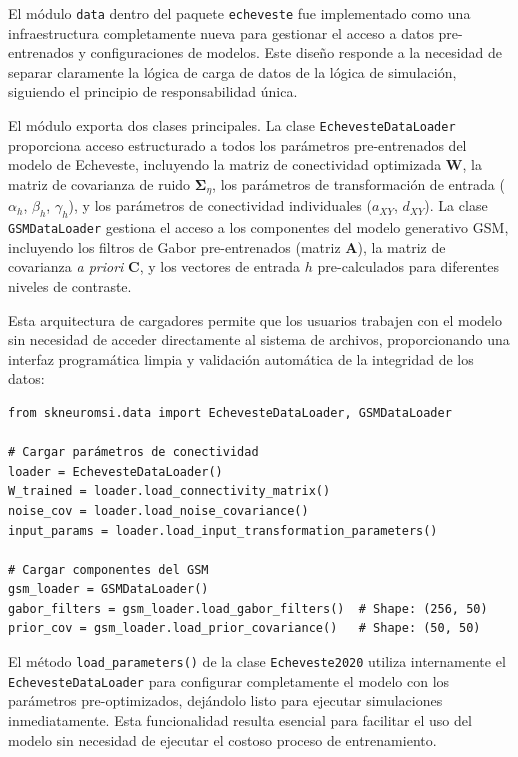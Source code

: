 El módulo \texttt{data} dentro del paquete \texttt{echeveste} fue implementado como una infraestructura completamente nueva para gestionar el acceso a datos pre-entrenados y configuraciones de modelos. Este diseño responde a la necesidad de separar claramente la lógica de carga de datos de la lógica de simulación, siguiendo el principio de responsabilidad única.

El módulo exporta dos clases principales. La clase \texttt{EchevesteDataLoader} proporciona acceso estructurado a todos los parámetros pre-entrenados del modelo de Echeveste, incluyendo la matriz de conectividad optimizada $\mathbf{W}$, la matriz de covarianza de ruido $\boldsymbol{\Sigma}_\eta$, los parámetros de transformación de entrada ($\alpha_h$, $\beta_h$, $\gamma_h$), y los parámetros de conectividad individuales ($a_{XY}$, $d_{XY}$). La clase \texttt{GSMDataLoader} gestiona el acceso a los componentes del modelo generativo \acrshort{GSM}, incluyendo los filtros de Gabor pre-entrenados (matriz $\mathbf{A}$), la matriz de covarianza \textit{a priori} $\mathbf{C}$, y los vectores de entrada $h$ pre-calculados para diferentes niveles de contraste.

Esta arquitectura de cargadores permite que los usuarios trabajen con el modelo sin necesidad de acceder directamente al sistema de archivos, proporcionando una interfaz programática limpia y validación automática de la integridad de los datos:

\begin{code}
\begin{verbatim}
from skneuromsi.data import EchevesteDataLoader, GSMDataLoader

# Cargar parámetros de conectividad
loader = EchevesteDataLoader()
W_trained = loader.load_connectivity_matrix()
noise_cov = loader.load_noise_covariance()
input_params = loader.load_input_transformation_parameters()

# Cargar componentes del GSM
gsm_loader = GSMDataLoader()
gabor_filters = gsm_loader.load_gabor_filters()  # Shape: (256, 50)
prior_cov = gsm_loader.load_prior_covariance()   # Shape: (50, 50)
\end{verbatim}
\caption{Uso de los cargadores de datos implementados.}
\label{code:data_loaders}
\end{code}
\vspace{1.5em}

El método \texttt{load\_parameters()} de la clase \texttt{Echeveste2020} utiliza internamente el \texttt{Echeveste\allowbreak DataLoader} para configurar completamente el modelo con los parámetros pre-optimizados, dejándolo listo para ejecutar simulaciones inmediatamente. Esta funcionalidad resulta esencial para facilitar el uso del modelo sin necesidad de ejecutar el costoso proceso de entrenamiento.


